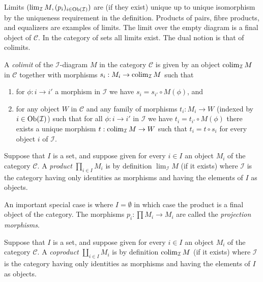 \noindent
Limits $(\mathop{\mathrm{lim}}\nolimits_\mathcal{I} M, (p_i)_{i\in
\mathop{\mathrm{Ob}}\nolimits(\mathcal{I})})$ are
(if they exist)
unique up to unique isomorphism by the
uniqueness requirement
in the definition. Products of pairs, fibre
products, and equalizers are
examples of limits. The limit over the empty
diagram is a final object
of $\mathcal{C}$.
In the category of sets all limits exist.
The dual notion is that of colimits.

\begin{definition}
\label{definition-colimit}
A {\it colimit} of the $\mathcal{I}$-diagram
$M$ in the category
$\mathcal{C}$ is given by an object
$\mathop{\mathrm{colim}}\nolimits_\mathcal{I} M$ in $\mathcal{C}$
together with morphisms $s_i : M_i \to
\mathop{\mathrm{colim}}\nolimits_\mathcal{I} M$ such that
\begin{enumerate}
\item for $\phi : i \to i'$ a morphism
in $\mathcal{I}$ we have $s_i = s_{i'} \circ
M(\phi)$, and
\item for any object $W$ in $\mathcal{C}$ and
any family of
morphisms $t_i : M_i \to W$ (indexed by $i
\in \mathop{\mathrm{Ob}}\nolimits(\mathcal{I})$)
such that for all $\phi : i \to i'$
in $\mathcal{I}$ we have $t_i = t_{i'} \circ
M(\phi)$ there
exists a unique morphism $t :
\mathop{\mathrm{colim}}\nolimits_\mathcal{I} M \to W$ such that
$t_i = t \circ s_i$ for every object $i$ of
$\mathcal{I}$.
\end{enumerate}
\end{definition}

\begin{definition}
\label{definition-product-as-a-limit}
Suppose that $I$ is a set, and suppose given
for every $i \in I$ an
object $M_i$ of the category $\mathcal{C}$. A
{\it product}
$\prod_{i\in I} M_i$ is by definition
$\lim_\mathcal{I} M$
(if it exists)
where $\mathcal{I}$ is the category having
only identities as
morphisms and having the elements of $I$ as
objects.
\end{definition}

\noindent
An important special case is where $I =
\emptyset$ in which case the
product is a final object of the category.
The morphisms $p_i : \prod M_i \to M_i$ are
called the
{\it projection morphisms}.

\begin{definition}
\label{definition-coproduct}
Suppose that $I$ is a set, and suppose given
for every $i \in I$ an
object $M_i$ of the category $\mathcal{C}$. A
{\it coproduct}
$\coprod_{i\in I} M_i$ is by definition
$\mathop{\mathrm{colim}}\nolimits_\mathcal{I} M$
(if it exists) where $\mathcal{I}$ is the
category having only
identities as morphisms and having the
elements of $I$ as objects.
\end{definition}

